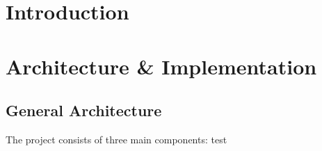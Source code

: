\documentclass[ twoside,openright,titlepage,numbers=noenddot,headinclude,%
                footinclude=true,cleardoublepage=empty,abstractoff, %
                BCOR=5mm,paper=a4,fontsize=11pt,%
                ngerman,american,%
                ]{scrreprt}
\begin{document}
\frenchspacing
\raggedbottom
{} %
\pagestyle{plain}



\pagestyle{scrheadings}
\cleardoublepage
\cleardoublepage{}
\cleardoublepage


\chapter{Introduction}
\label{cha:introduction}


\chapter{Architecture \& Implementation}
\label{cha:arch--impl}

\section{General Architecture}
The project consists of three main components: test
\end{document}
